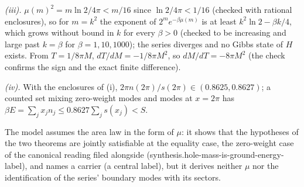 \emph{(iii).} $\mu(m)^{2} = m\ln 2/4\pi < m/16$ since $\ln 2/4\pi < 1/16$ (checked with rational enclosures), so for $m = k^{2}$ the exponent of $2^{m}e^{-\beta\mu(m)}$ is at least $k^{2}\ln 2 - \beta k/4$, which grows without bound in $k$ for every $\beta > 0$ (checked to be increasing and large past $k = \beta$ for $\beta = 1, 10, 1000$); the series diverges and no Gibbs state of $H$ exists. From $T = 1/8\pi M$, $dT/dM = -1/8\pi M^{2}$, so $dM/dT = -8\pi M^{2}$ (the check confirms the sign and the exact finite difference).

\emph{(iv).} With the enclosures of (i), $2\pi n(2\pi)/s(2\pi) \in (0.8625, 0.8627)$; a counted set mixing zero-weight modes and modes at $x = 2\pi$ has $\beta E = \sum_{j}x_{j}n_{j} \le 0.8627\sum_{j}s(x_{j}) < S$.

The model assumes the area law in the form of $\mu$: it shows that the hypotheses of the two theorems are jointly satisfiable at the equality case, the zero-weight case of the canonical reading filed alongside (synthesis.hole-mass-is-ground-energy-label), and names a carrier (a central label), but it derives neither $\mu$ nor the identification of the series' boundary modes with its sectors.
